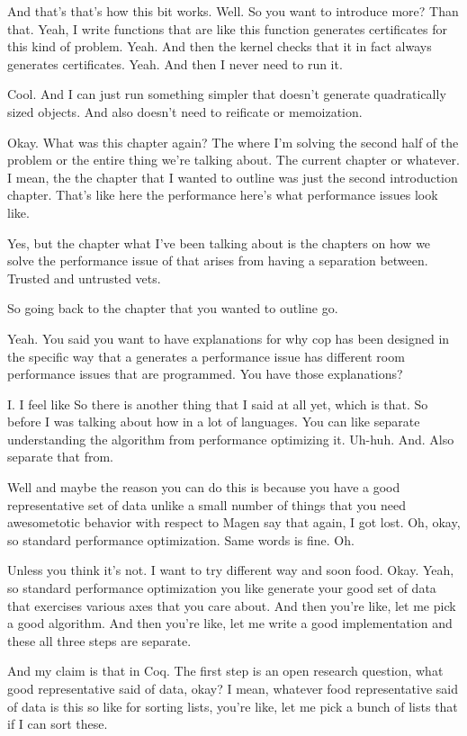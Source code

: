 \begin{subappendices}
    And that's that's how this bit works. Well. So you want to introduce more? Than that. Yeah, I write functions that are like this function generates certificates for this kind of problem. Yeah. And then the kernel checks that it in fact always generates certificates. Yeah. And then I never need to run it. 
    
    Cool. And I can just run something simpler that doesn't generate quadratically sized objects. And also doesn't need to reificate or memoization. 
    
    Okay. What was this chapter again? The where I'm solving the second half of the problem or the entire thing we're talking about. The current chapter or whatever. I mean, the the chapter that I wanted to outline was just the second introduction chapter. That's like here the performance here's what performance issues look like. 
    
    Yes, but the chapter what I've been talking about is the chapters on how we solve the performance issue of that arises from having a separation between. Trusted and untrusted vets. 
    
    So going back to the chapter that you wanted to outline go. 
    
    Yeah. You said you want to have explanations for why cop has been designed in the specific way that a generates a performance issue has different room performance issues that are programmed. You have those explanations? 
    
    I. I feel like So there is another thing that I said at all yet, which is that. So before I was talking about how in a lot of languages. You can like separate understanding the algorithm from performance optimizing it. Uh-huh. And. Also separate that from. 
    
    Well and maybe the reason you can do this is because you have a good representative set of data unlike a small number of things that you need awesometotic behavior with respect to Magen say that again, I got lost. Oh, okay, so standard performance optimization. Same words is fine. Oh. 
    
    Unless you think it's not. I want to try different way and soon food. Okay. Yeah, so standard performance optimization you like generate your good set of data that exercises various axes that you care about. And then you're like, let me pick a good algorithm. And then you're like, let me write a good implementation and these all three steps are separate. 
    
    And my claim is that in Coq. The first step is an open research question, what good representative said of data, okay? I mean, whatever food representative said of data is this so like for sorting lists, you're like, let me pick a bunch of lists that if I can sort these. 
    

\end{subappendices}
